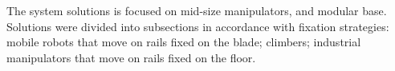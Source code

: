 
The system solutions is focused on mid-size manipulators, and modular base.
Solutions were divided into subsections in accordance with fixation strategies:
mobile robots that move on rails fixed on the blade; climbers; industrial
manipulators that move on rails fixed on the floor.






 
%